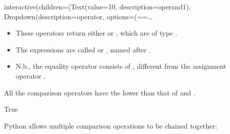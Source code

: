 \documentclass[letterpaper,10pt,english]{sphinxmanual}
\begin{document}
\begin{sphinxVerbatim}[commandchars=\\\{\}]
interactive(children=(Text(value=\PYGZsq{}10\PYGZsq{}, description=\PYGZsq{}operand1\PYGZsq{}), Dropdown(description=\PYGZsq{}operator\PYGZsq{}, options=(\PYGZsq{}==\PYGZsq{}…
\end{sphinxVerbatim}
\begin{itemize}
\item {} 
These operators return either  or , which are  of type .

\item {} 
The expressions are called  or , named after .

\item {} 
N.b., the equality operator \sphinxcode{\sphinxupquote{==}} consists of , different from the assignment operator \sphinxcode{\sphinxupquote{=}}.

\end{itemize}


All the comparison operators have the  lower than that of \sphinxcode{\sphinxupquote{+}} and \sphinxcode{\sphinxupquote{\sphinxhyphen{}}}.

\begin{sphinxVerbatim}[commandchars=\\\{\}]
      
\end{sphinxVerbatim}

\begin{sphinxVerbatim}[commandchars=\\\{\}]
True
\end{sphinxVerbatim}

Python allows multiple comparison operations to be chained together:

\begin{sphinxVerbatim}[commandchars=\\\{\}]
   
\end{sphinxVerbatim}
\end{document}
